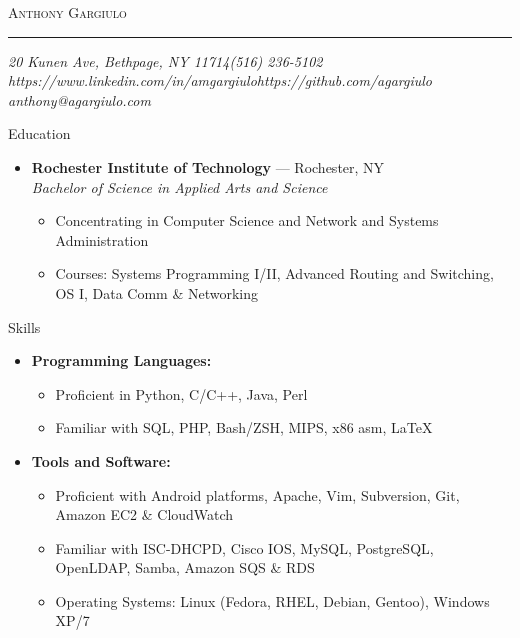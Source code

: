 \documentclass[10pt,oneside]{article}
\makeatletter
\newcommand{\name}{Anthony Gargiulo}
\newcommand{\addr}{20 Kunen Ave, Bethpage, NY 11714}
\newcommand{\mobilePhone}{(516) 236-5102}
\newcommand{\email}{anthony@agargiulo.com}
\newcommand{\github}{https://github.com/agargiulo}
\newcommand{\linkedin}{https://www.linkedin.com/in/amgargiulo}
\newcommand{\bigname}[1]{
	\begin{center}\fontfamily{ppl}\selectfont\Huge\scshape#1\end{center}
}
\newenvironment{ressection}[1]{
	\vspace{3pt}
	{\fontfamily{ppl}\selectfont\Large#1}
	\begin{itemize}
	\vspace{2pt}
}{
	\end{itemize}
}
\newcommand{\resitem}[1]{
	\vspace{-2pt}
	\item \begin{flushleft} #1 \end{flushleft}
}
\newcommand{\ressubitem}[1]{
	\vspace{-1pt}
	\item \begin{flushleft} #1 \end{flushleft}
}
\newcommand{\resbigitem}[3]{
	\vspace{-3pt}
	\item
	\textbf{#1} --- #2 \\
	\textit{#3}
}
\newenvironment{ressubsec}[3]{
	\resbigitem{#1}{#2}{#3}
	\vspace{-1pt}
	\begin{itemize}
}{
	\end{itemize}
}
\newenvironment{reslist}[1]{
	\resitem{\textbf{#1}}
	\vspace{-3pt}
	\begin{itemize}
}{
	\end{itemize}
}
\makeatother
\begin{document}
 \selectfont

\bigname{\name}

\vspace{-4pt} \rule{\textwidth}{1pt}

\vspace{-1pt} {\normalsize\itshape \addr \hfill \mobilePhone \\ \linkedin \hfill \github \\ \email}

\vspace{15 pt}



%
%


\begin{ressection}{Education}

	\begin{ressubsec}{Rochester Institute of Technology}{Rochester, NY}{Bachelor of Science in Applied Arts and Science}
		\ressubitem{Concentrating in Computer Science and Network and Systems Administration}
		\ressubitem{Courses: Systems Programming I/II, Advanced Routing and Switching, OS I, Data Comm \& Networking}
	\end{ressubsec}

\end{ressection}


\begin{ressection}{Skills}


	\begin{reslist}{Programming Languages:}
		\ressubitem{Proficient in Python, C/C++, Java, Perl}
		\ressubitem{Familiar with SQL, PHP, Bash/ZSH, MIPS, x86 asm, \LaTeX}
	\end{reslist}

	\begin{reslist}{Tools and Software:}
		\ressubitem{Proficient with Android platforms, Apache, Vim, Subversion, Git, Amazon EC2 \& CloudWatch}
		\ressubitem{Familiar with ISC-DHCPD, Cisco IOS, MySQL, PostgreSQL, OpenLDAP, Samba, Amazon SQS \& RDS}
		\ressubitem{Operating Systems: Linux (Fedora, RHEL, Debian, Gentoo), Windows XP/7}
	\end{reslist}

\end{ressection}
\end{document}

